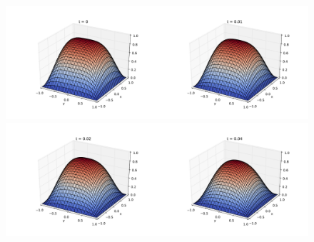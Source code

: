 \documentclass{article}
\begin{document}
\begin{figure}
  \centering
  \includegraphics[width=0.5\textwidth]{1/t000.pdf}\includegraphics[width=0.5\textwidth]{1/t001.pdf}
  \includegraphics[width=0.5\textwidth]{1/t002.pdf}\includegraphics[width=0.5\textwidth]{1/t004.pdf}

\end{figure}
\end{document}
